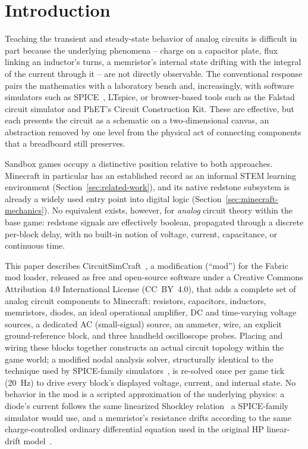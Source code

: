 \section{Introduction}
\label{sec:introduction}

Teaching the transient and steady-state behavior of analog circuits is difficult in part
because the underlying phenomena -- charge on a capacitor plate, flux linking an inductor's
turns, a memristor's internal state drifting with the integral of the current through it --
are not directly observable. The conventional response pairs the mathematics with a
laboratory bench and, increasingly, with software simulators such as
SPICE~\cite{nagel1973spice}, LTspice, or browser-based tools such as the Falstad circuit
simulator and PhET's Circuit Construction Kit. These are effective, but each presents the
circuit as a schematic on a two-dimensional canvas, an abstraction removed by one level from
the physical act of connecting components that a breadboard still preserves.

Sandbox games occupy a distinctive position relative to both approaches. Minecraft in
particular has an established record as an informal STEM learning environment
(Section~\ref{sec:related-work}), and its native redstone subsystem is already a widely used
entry point into digital logic (Section~\ref{sec:minecraft-mechanics}). No equivalent exists,
however, for \emph{analog} circuit theory within the base game: redstone signals are
effectively boolean, propagated through a discrete per-block delay, with no built-in notion
of voltage, current, capacitance, or continuous time.

This paper describes CircuitSimCraft~\cite{picos2026circuitsimcraft}, a modification (``mod'') for
the Fabric mod loader, released as free and open-source software under a Creative Commons
Attribution 4.0 International License (CC~BY~4.0), that adds a complete set of analog circuit
components to Minecraft: resistors, capacitors,
inductors, memristors, diodes, an ideal operational amplifier, DC and time-varying voltage
sources, a dedicated AC (small-signal) source, an ammeter, wire, an explicit
ground-reference block, and three handheld oscilloscope probes. Placing and wiring these
blocks together constructs an actual circuit topology within the game world; a modified
nodal analysis solver, structurally identical to the technique used by SPICE-family
simulators~\cite{ho1975mna}, is re-solved once per game tick (20~Hz) to drive every block's
displayed voltage, current, and internal state. No behavior in the mod is a scripted
approximation of the underlying physics: a diode's current follows the same linearized
Shockley relation~\cite{shockley1949diode} a SPICE-family simulator would use, and a
memristor's resistance drifts according to the same charge-controlled ordinary differential
equation used in the original HP linear-drift model~\cite{strukov2008missing}.

